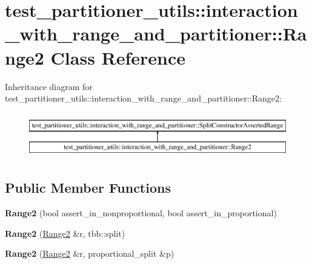 \hypertarget{classtest__partitioner__utils_1_1interaction__with__range__and__partitioner_1_1Range2}{}\section{test\+\_\+partitioner\+\_\+utils\+:\+:interaction\+\_\+with\+\_\+range\+\_\+and\+\_\+partitioner\+:\+:Range2 Class Reference}
\label{classtest__partitioner__utils_1_1interaction__with__range__and__partitioner_1_1Range2}
Inheritance diagram for test\+\_\+partitioner\+\_\+utils\+:\+:interaction\+\_\+with\+\_\+range\+\_\+and\+\_\+partitioner\+:\+:Range2\+:\begin{figure}[H]
\begin{center}
\leavevmode
\includegraphics[height=2.000000cm]{classtest__partitioner__utils_1_1interaction__with__range__and__partitioner_1_1Range2}
\end{center}
\end{figure}
\subsection*{Public Member Functions}
\begin{DoxyCompactItemize}
\item 
\hypertarget{classtest__partitioner__utils_1_1interaction__with__range__and__partitioner_1_1Range2_adae151b902799ee7b5676bfbb36a09ff}{}{\bfseries Range2} (bool assert\+\_\+in\+\_\+nonproportional, bool assert\+\_\+in\+\_\+proportional)\label{classtest__partitioner__utils_1_1interaction__with__range__and__partitioner_1_1Range2_adae151b902799ee7b5676bfbb36a09ff}

\item 
\hypertarget{classtest__partitioner__utils_1_1interaction__with__range__and__partitioner_1_1Range2_a2dd7e8891b3fcec846b1f808984496c3}{}{\bfseries Range2} (\hyperlink{classtest__partitioner__utils_1_1interaction__with__range__and__partitioner_1_1Range2}{Range2} \&r, tbb\+::split)\label{classtest__partitioner__utils_1_1interaction__with__range__and__partitioner_1_1Range2_a2dd7e8891b3fcec846b1f808984496c3}

\item 
\hypertarget{classtest__partitioner__utils_1_1interaction__with__range__and__partitioner_1_1Range2_a91c4d9437432b9e4e1171ec20d439d93}{}{\bfseries Range2} (\hyperlink{classtest__partitioner__utils_1_1interaction__with__range__and__partitioner_1_1Range2}{Range2} \&r, proportional\+\_\+split \&p)\label{classtest__partitioner__utils_1_1interaction__with__range__and__partitioner_1_1Range2_a91c4d9437432b9e4e1171ec20d439d93}

\end{DoxyCompactItemize}
